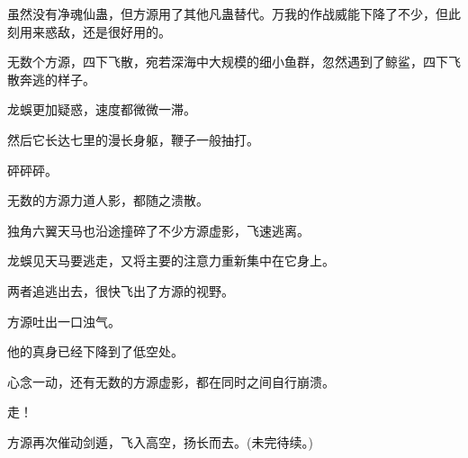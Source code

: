 \begin{this_body}
虽然没有净魂仙蛊，但方源用了其他凡蛊替代。万我的作战威能下降了不少，但此刻用来惑敌，还是很好用的。

无数个方源，四下飞散，宛若深海中大规模的细小鱼群，忽然遇到了鲸鲨，四下飞散奔逃的样子。

龙蜈更加疑惑，速度都微微一滞。

然后它长达七里的漫长身躯，鞭子一般抽打。

砰砰砰。

无数的方源力道人影，都随之溃散。

独角六翼天马也沿途撞碎了不少方源虚影，飞速逃离。

龙蜈见天马要逃走，又将主要的注意力重新集中在它身上。

两者追逃出去，很快飞出了方源的视野。

方源吐出一口浊气。

他的真身已经下降到了低空处。

心念一动，还有无数的方源虚影，都在同时之间自行崩溃。

走！

方源再次催动剑遁，飞入高空，扬长而去。(未完待续。)

\end{this_body}

